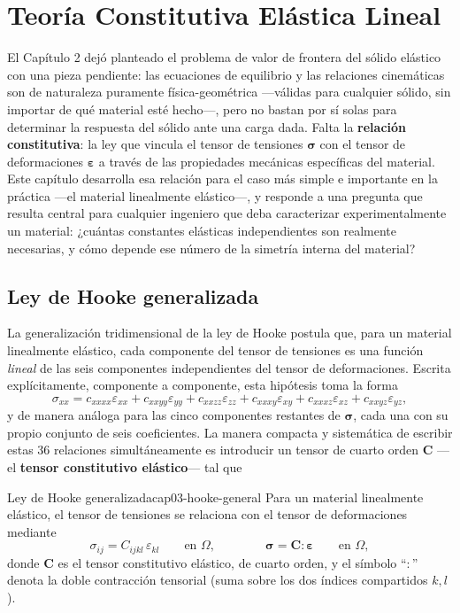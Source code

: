 \chapter{Teoría Constitutiva Elástica Lineal}
\label{sec:cap03-teoria-constitutiva}

El Capítulo 2 dejó planteado el problema de valor de frontera del sólido elástico con una pieza pendiente: las ecuaciones de equilibrio y las relaciones cinemáticas son de naturaleza puramente física-geométrica —válidas para cualquier sólido, sin importar de qué material esté hecho—, pero no bastan por sí solas para determinar la respuesta del sólido ante una carga dada. Falta la \textbf{relación constitutiva}: la ley que vincula el tensor de tensiones $\bm\sigma$ con el tensor de deformaciones $\bm\varepsilon$ a través de las propiedades mecánicas específicas del material. Este capítulo desarrolla esa relación para el caso más simple e importante en la práctica —el material linealmente elástico—, y responde a una pregunta que resulta central para cualquier ingeniero que deba caracterizar experimentalmente un material: ¿cuántas constantes elásticas independientes son realmente necesarias, y cómo depende ese número de la simetría interna del material?

\section{Ley de Hooke generalizada}
\label{sec:cap03-hooke-general}

La generalización tridimensional de la ley de Hooke postula que, para un material linealmente elástico, cada componente del tensor de tensiones es una función \emph{lineal} de las seis componentes independientes del tensor de deformaciones. Escrita explícitamente, componente a componente, esta hipótesis toma la forma
\[
\sigma_{xx} = c_{xxxx}\varepsilon_{xx} + c_{xxyy}\varepsilon_{yy} + c_{xxzz}\varepsilon_{zz} + c_{xxxy}\varepsilon_{xy} + c_{xxxz}\varepsilon_{xz} + c_{xxyz}\varepsilon_{yz},
\]
y de manera análoga para las cinco componentes restantes de $\bm\sigma$, cada una con su propio conjunto de seis coeficientes. La manera compacta y sistemática de escribir estas 36 relaciones simultáneamente es introducir un tensor de cuarto orden $\bm C$ —el \textbf{tensor constitutivo elástico}— tal que

\begin{ecnimportante}{Ley de Hooke generalizada}{cap03-hooke-general}
Para un material linealmente elástico, el tensor de tensiones se relaciona con el tensor de deformaciones mediante
\[
\sigma_{ij} = C_{ijkl}\,\varepsilon_{kl} \qquad \text{en } \Omega, \qquad\qquad \bm\sigma = \bm C : \bm\varepsilon \qquad \text{en } \Omega,
\]
donde $\bm C$ es el tensor constitutivo elástico, de cuarto orden, y el símbolo ``$:$'' denota la doble contracción tensorial (suma sobre los dos índices compartidos $k,l$).
\end{ecnimportante}


